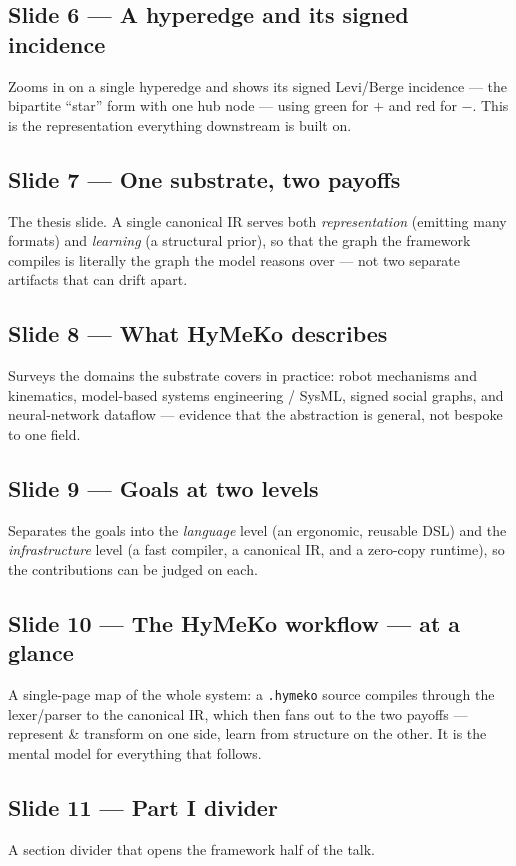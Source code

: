 \documentclass[10pt]{article}
\begin{document}
\subsection*{Slide 6 --- A hyperedge and its signed incidence}
Zooms in on a single hyperedge and shows its signed Levi/Berge incidence --- the bipartite ``star'' form with one hub node --- using green for $+$ and red for $-$. This is the representation everything downstream is built on.

\subsection*{Slide 7 --- One substrate, two payoffs}
The thesis slide. A single canonical IR serves both \emph{representation} (emitting many formats) and \emph{learning} (a structural prior), so that the graph the framework compiles is literally the graph the model reasons over --- not two separate artifacts that can drift apart.

\subsection*{Slide 8 --- What HyMeKo describes}
Surveys the domains the substrate covers in practice: robot mechanisms and kinematics, model-based systems engineering / SysML, signed social graphs, and neural-network dataflow --- evidence that the abstraction is general, not bespoke to one field.

\subsection*{Slide 9 --- Goals at two levels}
Separates the goals into the \emph{language} level (an ergonomic, reusable DSL) and the \emph{infrastructure} level (a fast compiler, a canonical IR, and a zero-copy runtime), so the contributions can be judged on each.

\subsection*{Slide 10 --- The HyMeKo workflow --- at a glance}
A single-page map of the whole system: a \texttt{.hymeko} source compiles through the lexer/parser to the canonical IR, which then fans out to the two payoffs --- represent \& transform on one side, learn from structure on the other. It is the mental model for everything that follows.

\subsection*{Slide 11 --- Part I divider}
A section divider that opens the framework half of the talk.
\end{document}
